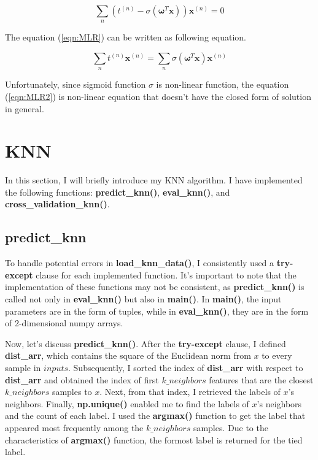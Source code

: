 \documentclass[12pt]{article}
\begin{document}
\begin{equation}
    \sum_n\left(t^{(n)} - \sigma(\boldsymbol{\omega}^T\boldsymbol{x})\right)\boldsymbol{x}^{(n)} = 0
    \label{eqn:MLR}
\end{equation}

The equation (\ref{eqn:MLR}) can be written as following equation.

\begin{equation}
    \sum_n t^{(n)}\boldsymbol{x}^{(n)} = \sum_n\sigma(\boldsymbol{\omega}^T\boldsymbol{x})\boldsymbol{x}^{(n)}
    \label{eqn:MLR2}
\end{equation}

Unfortunately, since sigmoid function $\sigma$ is non-linear function, the equation (\ref{eqn:MLR2}) is non-linear equation that doesn't have the closed form of solution in general.

\section{KNN}

In this section, I will briefly introduce my KNN algorithm. I have implemented the following functions: \textbf{predict\_knn()}, \textbf{eval\_knn()}, and \textbf{cross\_validation\_knn()}.

\subsection{predict\_knn}

To handle potential errors in \textbf{load\_knn\_data()}, I consistently used a \textbf{try-except} clause for each implemented function. It's important to note that the implementation of these functions may not be consistent, as \textbf{predict\_knn()} is called not only in \textbf{eval\_knn()} but also in \textbf{main()}. In \textbf{main()}, the input parameters are in the form of tuples, while in \textbf{eval\_knn()}, they are in the form of 2-dimensional numpy arrays.

Now, let's discuss \textbf{predict\_knn()}. After the \textbf{try-except} clause, I defined \textbf{dist\_arr}, which contains the square of the Euclidean norm from $x$ to every sample in $inputs$. Subsequently, I sorted the index of \textbf{dist\_arr} with respect to \textbf{dist\_arr} and obtained the index of first $k\_neighbors$ features that are the closest $k\_neighbors$ samples to $x$. Next, from that index, I retrieved the labels of $x$'s neighbors. Finally, \textbf{np.unique()} enabled me to find the labels of $x$'s neighbors and the count of each label. I used the \textbf{argmax()} function to get the label that appeared most frequently among the $k\_neighbors$ samples.  Due to the characteristics of \textbf{argmax()} function, the formost label is returned for the tied label.
\end{document}
